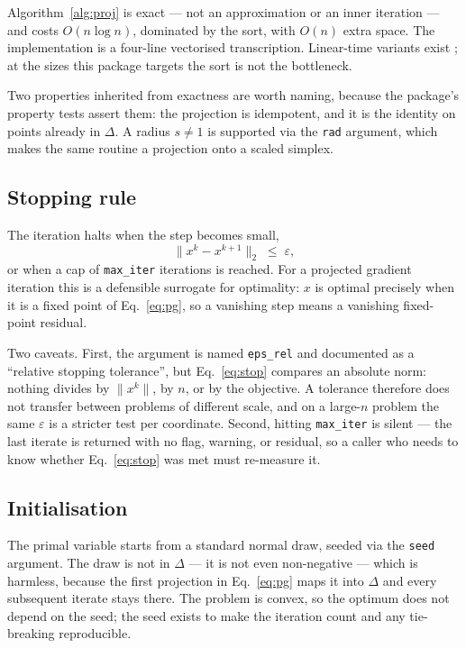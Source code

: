 \documentclass[11pt,a4paper]{article}
\newcommand{\code}[1]{\texttt{#1}}
\newcommand{\simplex}{\Delta}
\begin{document}
Algorithm~\ref{alg:proj} is exact --- not an approximation or an inner iteration
--- and costs $O(n \log n)$, dominated by the sort, with $O(n)$ extra space. The
implementation is a four-line vectorised transcription. Linear-time variants
exist \citep{condat2016}; at the sizes this package targets the sort is not the
bottleneck.

Two properties inherited from exactness are worth naming, because the package's
property tests assert them: the projection is idempotent, and it is the identity
on points already in $\simplex$. A radius $s \neq 1$ is supported via the
\code{rad} argument, which makes the same routine a projection onto a scaled
simplex.

\subsection{Stopping rule}

The iteration halts when the step becomes small,
\begin{equation}
  \| x^{k} - x^{k+1} \|_2 \;\le\; \varepsilon,
  \label{eq:stop}
\end{equation}
or when a cap of \code{max\_iter} iterations is reached. For a projected
gradient iteration this is a defensible surrogate for optimality: $x$ is optimal
precisely when it is a fixed point of Eq.~\eqref{eq:pg}, so a vanishing step
means a vanishing fixed-point residual.

Two caveats. First, the argument is named \code{eps\_rel} and documented as a
``relative stopping tolerance'', but Eq.~\eqref{eq:stop} compares an absolute
norm: nothing divides by $\|x^k\|$, by $n$, or by the objective. A tolerance
therefore does not transfer between problems of different scale, and on a
large-$n$ problem the same $\varepsilon$ is a stricter test per coordinate.
Second, hitting \code{max\_iter} is silent --- the last iterate is returned with
no flag, warning, or residual, so a caller who needs to know whether
Eq.~\eqref{eq:stop} was met must re-measure it.

\subsection{Initialisation}

The primal variable starts from a standard normal draw, seeded via the
\code{seed} argument. The draw is not in $\simplex$ --- it is not even
non-negative --- which is harmless, because the first projection in
Eq.~\eqref{eq:pg} maps it into $\simplex$ and every subsequent iterate stays
there. The problem is convex, so the optimum does not depend on the seed; the
seed exists to make the iteration count and any tie-breaking reproducible.
\end{document}
